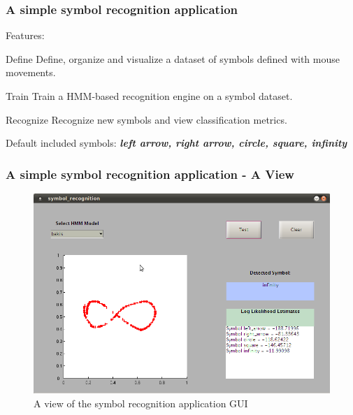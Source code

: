 \documentclass{beamer}
\begin{document}
\begin{frame}[t]
	\frametitle{A simple symbol recognition application}
	Features:
	\pause
	\begin{block}{Define}
		Define, organize and visualize a dataset of symbols defined with mouse movements.
	\end{block}
	\pause
	
	\begin{block}{Train}
		Train a HMM-based recognition engine on a symbol dataset.
	\end{block}
	\pause
	
	\begin{block}{Recognize}
		Recognize new symbols and view classification metrics.
	\end{block}
	\pause
	
	\begin{block}{}
		Default included symbols: \textbf{\emph{left arrow, right arrow, circle, square, infinity}}
	\end{block}
\end{frame}

\begin{frame}[t]
	\frametitle{A simple symbol recognition application - A View}
	
	\begin{figure}
  		\centering
		\includegraphics[height=0.70\textheight]{images/infinity.png}
		\caption{\tiny{A view of the symbol recognition application GUI}}
		\label{fig:baum-welch-alg}
  	\end{figure}	
\end{frame}
\end{document}
